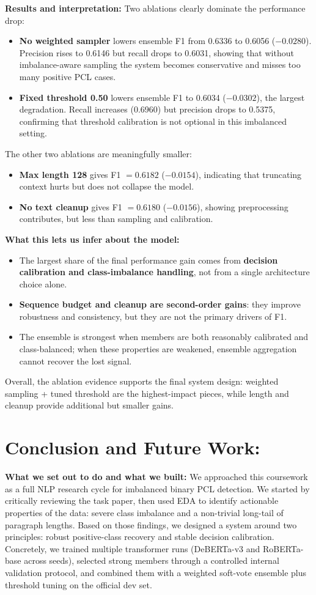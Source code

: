 \documentclass[11pt, a4paper]{article}
\begin{document}
\textbf{Results and interpretation:}
Two ablations clearly dominate the performance drop:
\begin{itemize}
  \item \textbf{No weighted sampler} lowers ensemble F1 from 0.6336 to 0.6056 (\(-0.0280\)). Precision rises to 0.6146 but recall drops to 0.6031, showing that without imbalance-aware sampling the system becomes conservative and misses too many positive PCL cases.
  \item \textbf{Fixed threshold 0.50} lowers ensemble F1 to 0.6034 (\(-0.0302\)), the largest degradation. Recall increases (0.6960) but precision drops to 0.5375, confirming that threshold calibration is not optional in this imbalanced setting.
\end{itemize}

The other two ablations are meaningfully smaller:
\begin{itemize}
  \item \textbf{Max length 128} gives F1 \(=0.6182\) (\(-0.0154\)), indicating that truncating context hurts but does not collapse the model.
  \item \textbf{No text cleanup} gives F1 \(=0.6180\) (\(-0.0156\)), showing preprocessing contributes, but less than sampling and calibration.
\end{itemize}

\textbf{What this lets us infer about the model:}
\begin{itemize}
  \item The largest share of the final performance gain comes from \textbf{decision calibration and class-imbalance handling}, not from a single architecture choice alone.
  \item \textbf{Sequence budget and cleanup are second-order gains}: they improve robustness and consistency, but they are not the primary drivers of F1.
  \item The ensemble is strongest when members are both reasonably calibrated and class-balanced; when these properties are weakened, ensemble aggregation cannot recover the lost signal.
\end{itemize}

Overall, the ablation evidence supports the final system design: weighted sampling + tuned threshold are the highest-impact pieces, while length and cleanup provide additional but smaller gains.
\section{Conclusion and Future Work:}
\textbf{What we set out to do and what we built:}
We approached this coursework as a full NLP research cycle for imbalanced binary PCL detection. We started by critically reviewing the task paper, then used EDA to identify actionable properties of the data: severe class imbalance and a non-trivial long-tail of paragraph lengths. Based on those findings, we designed a system around two principles: robust positive-class recovery and stable decision calibration. Concretely, we trained multiple transformer runs (DeBERTa-v3 and RoBERTa-base across seeds), selected strong members through a controlled internal validation protocol, and combined them with a weighted soft-vote ensemble plus threshold tuning on the official dev set.
\end{document}
